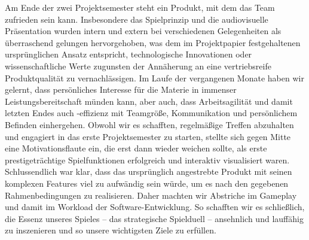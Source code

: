 Am Ende der zwei Projektsemester steht ein Produkt, mit dem das Team zufrieden sein kann. Insbesondere das Spielprinzip und die audiovisuelle Präsentation wurden intern und extern bei verschiedenen Gelegenheiten als überraschend gelungen hervorgehoben, was dem im Projektpapier festgehaltenen ursprünglichen Ansatz entspricht, technologische Innovationen oder wissenschaftliche Werte zugunsten der Annäherung an eine vertriebsreife Produktqualität zu vernachlässigen.
Im Laufe der vergangenen Monate haben wir gelernt, dass persönliches Interesse für die Materie in immenser Leistungsbereitschaft münden kann, aber auch, dass Arbeitsagilität und damit letzten Endes auch -effizienz mit Teamgröße, Kommunikation und persönlichem Befinden einhergehen. Obwohl wir es schafften, regelmäßige Treffen abzuhalten und engagiert in das erste Projektsemester zu starten, stellte sich gegen Mitte eine Motivationsflaute ein, die erst dann wieder weichen sollte, als erste prestigeträchtige Spielfunktionen erfolgreich und interaktiv visualisiert waren.
Schlussendlich war klar, dass das ursprünglich angestrebte Produkt mit seinen komplexen Features viel zu aufwändig sein würde, um es nach den gegebenen Rahmenbedingungen zu realisieren. Daher machten wir Abstriche im Gameplay und damit im Workload der Software-Entwicklung. So schafften wir es schließlich, die Essenz unseres Spieles – das strategische Spielduell – ansehnlich und lauffähig zu inszenieren und so unsere wichtigsten Ziele zu erfüllen.
